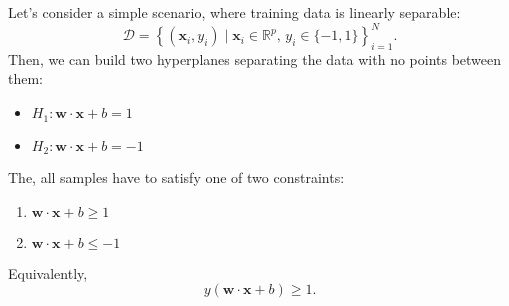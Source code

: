 Let's consider a simple scenario, where training data is linearly separable: 
$$\mathcal{D} = \left\{ (\mathbf{x}_i, y_i)\mid\mathbf{x}_i \in \mathbb{R}^p,\, y_i \in \{-1,1\}\right\}_{i=1}^N.$$
Then, we can build two hyperplanes separating the data with no points between them:
\begin{itemize}
	\item $H_1:\mathbf{w}\cdot \mathbf{x}+b=1$
	\item $H_2:\mathbf{w}\cdot \mathbf{x}+b=-1$
\end{itemize}

The, all samples have to satisfy one of two constraints:
\begin{enumerate}
	\item $\mathbf{w}\cdot \mathbf{x}+b\geq1$
	\item $\mathbf{w}\cdot \mathbf{x}+b\leq-1$
\end{enumerate}
Equivalently, 
$$y(\mathbf{w}\cdot \mathbf{x}+b)\geq 1.$$

